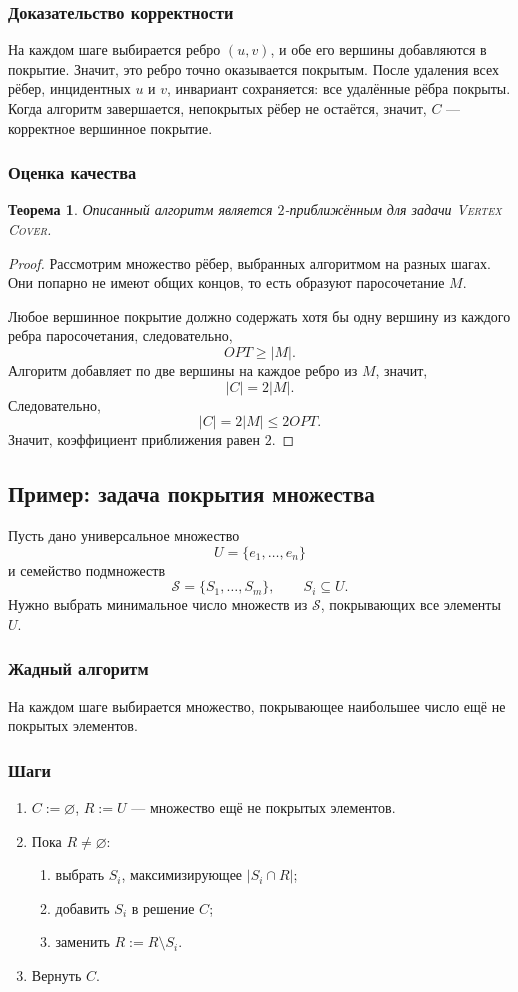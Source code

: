 \documentclass[12pt,a4paper]{article}
\theoremstyle{definition}
\theoremstyle{plain}
\newtheorem{theorem}{Теорема}[section]
\begin{document}
\subsubsection{Доказательство корректности}
На каждом шаге выбирается ребро $(u,v)$, и обе его вершины добавляются в покрытие. Значит, это ребро точно оказывается покрытым. После удаления всех рёбер, инцидентных $u$ и $v$, инвариант сохраняется: все удалённые рёбра покрыты. Когда алгоритм завершается, непокрытых рёбер не остаётся, значит, $C$ --- корректное вершинное покрытие.

\subsubsection{Оценка качества}
\begin{theorem}
Описанный алгоритм является $2$-приближённым для задачи \textsc{Vertex Cover}.
\end{theorem}

\begin{proof}
Рассмотрим множество рёбер, выбранных алгоритмом на разных шагах. Они попарно не имеют общих концов, то есть образуют паросочетание $M$.

Любое вершинное покрытие должно содержать хотя бы одну вершину из каждого ребра паросочетания, следовательно,
\[
OPT\ge |M|.
\]
Алгоритм добавляет по две вершины на каждое ребро из $M$, значит,
\[
|C|=2|M|.
\]
Следовательно,
\[
|C|=2|M|\le 2OPT.
\]
Значит, коэффициент приближения равен $2$.
\end{proof}

\subsection{Пример: задача покрытия множества}
Пусть дано универсальное множество
\[
U=\{e_1,\dots,e_n\}
\]
и семейство подмножеств
\[
\mathcal S=\{S_1,\dots,S_m\}, \qquad S_i\subseteq U.
\]
Нужно выбрать минимальное число множеств из $\mathcal S$, покрывающих все элементы $U$.

\subsubsection{Жадный алгоритм}
На каждом шаге выбирается множество, покрывающее наибольшее число ещё не покрытых элементов.

\subsubsection{Шаги}
\begin{enumerate}
\item $C:=\varnothing$, $R:=U$ --- множество ещё не покрытых элементов.
\item Пока $R\ne\varnothing$:
\begin{enumerate}
\item выбрать $S_i$, максимизирующее $|S_i\cap R|$;
\item добавить $S_i$ в решение $C$;
\item заменить $R:=R\setminus S_i$.
\end{enumerate}
\item Вернуть $C$.
\end{enumerate}
\end{document}
